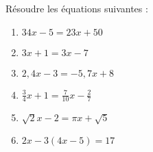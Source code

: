 \documentclass[a4paper,11pt,exos]{nsi} %
\begin{document}
\begin {exercice}
Résoudre les équations suivantes :
\begin{multicols}{2}
	\begin{enumerate}
		\item 	$34x-5=23x+50$
		\item 	$3x+1 = 3x -7$
		\item 	$2,4x-3=-5,7x+8$
		\item	$\displaystyle\frac{3}{4}x+1=\frac{7}{10}x-\frac{2}{7}$
		\item 	$\sqrt{2}x-2=\pi x +\sqrt{5}$
		\item	$2x-3(4x-5)=17$
	\end{enumerate}
\end{multicols}
\end {exercice}
\end{document}
